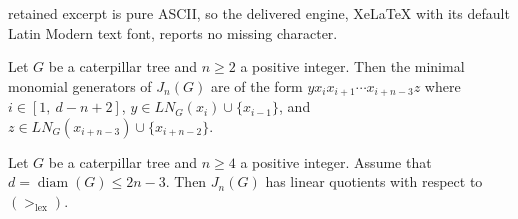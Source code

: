 \documentclass[10pt,a4paper]{amsart}
\DeclareMathOperator{\diam}{diam}
\DeclareMathOperator{\lex}{lex}
\begin{document}
retained excerpt is pure ASCII, so the delivered engine, XeLaTeX with its default Latin Modern text font, reports no missing character.
	\begin{lemma}\label{lem:gens-Jn-caterpillar}
		Let $G$ be a caterpillar tree and $n\geq 2$ a positive integer. Then the minimal monomial generators of $J_n(G)$ are of the form $yx_ix_{i+1}\cdots x_{i+n-3}z$ where $i\in [1,\ d-n+2]$, $y\in LN_G(x_i)\cup \{x_{i-1}\}$, and $z\in  LN_G(x_{i+n-3})\cup \{x_{i+n-2}\}$.
	\end{lemma}

	\begin{proposition}\label{prop:LQ-2n-3}
		Let $G$ be a caterpillar tree and $n\geq 4$ a positive integer. Assume that $d=\diam(G)\leq 2n-3$. Then $J_n(G)$ has linear quotients with respect to $(>_{\lex})$.
	\end{proposition}
\end{document}

